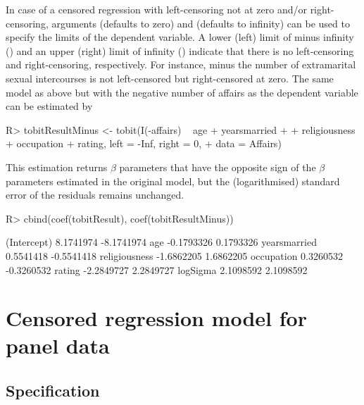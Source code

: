 \documentclass[article,nojss]{jss}
\begin{document}
In case of a censored regression with left-censoring not at zero
and/or right-censoring,
arguments  (defaults to zero) and
 (defaults to infinity)
can be used to specify the limits of the dependent variable.
A lower (left) limit of minus infinity ()
and an upper (right) limit of infinity ()
indicate that there is no left-censoring and right-censoring, respectively.
For instance, minus the number of extramarital sexual intercourses
is not left-censored but right-censored at zero.
The same model as above
but with the negative number of affairs as the dependent variable
can be estimated by
\begin{Schunk}
\begin{Sinput}
R> tobitResultMinus <- tobit(I(-affairs) ~ age + yearsmarried + 
+     religiousness + occupation + rating, left = -Inf, right = 0, 
+     data = Affairs)
\end{Sinput}
\end{Schunk}
This estimation returns $\beta$ parameters that have the opposite sign
of the $\beta$  parameters estimated in the original model,
but the (logarithmised) standard error of the residuals remains unchanged.
\begin{Schunk}
\begin{Sinput}
R> cbind(coef(tobitResult), coef(tobitResultMinus))
\end{Sinput}
\begin{Soutput}
                    [,1]       [,2]
(Intercept)    8.1741974 -8.1741974
age           -0.1793326  0.1793326
yearsmarried   0.5541418 -0.5541418
religiousness -1.6862205  1.6862205
occupation     0.3260532 -0.3260532
rating        -2.2849727  2.2849727
logSigma       2.1098592  2.1098592
\end{Soutput}
\end{Schunk}



\section{Censored regression model for panel data}
\label{sec:panel}

\subsection{Specification}
\end{document}
